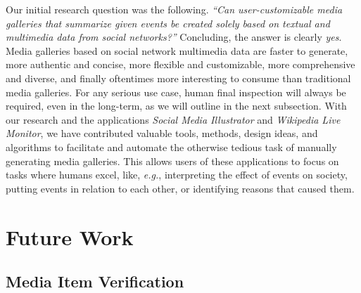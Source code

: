Our initial research question was the following.
\textit{``Can user-customizable media galleries
that summarize given events be
created solely based on textual and multimedia data
from social networks?''}
Concluding, the answer is clearly \emph{yes}.
Media galleries based on social network multimedia data
are faster to generate, more authentic and concise,
more flexible and customizable, more comprehensive and diverse, and finally oftentimes more interesting to consume than
traditional media galleries.
For any serious use case, human final inspection will
always be required, even in the long-term,
as we will outline in the next subsection.
With our research and the applications
\emph{Social Media Illustrator} and \emph{Wikipedia Live Monitor},
we have contributed valuable tools,
methods, design ideas, and algorithms
to facilitate and automate the otherwise tedious task
of manually generating media galleries.
This allows users of these applications
to focus on tasks where humans excel,
like, \emph{e.g.}, interpreting the effect of events on society,
putting events in relation to each other,
or identifying reasons that caused them.

\section{Future Work}

\subsection{Media Item Verification}

